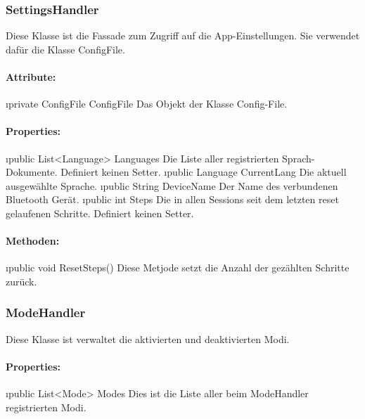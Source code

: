 \documentclass[../entwurf.tex]{subfiles}
\begin{document}
			\subsubsection{SettingsHandler}
				Diese Klasse ist die Fassade zum Zugriff auf die App-Einstellungen. Sie verwendet dafür die Klasse ConfigFile.
				\paragraph{Attribute:}
					\begin{itemize}
						\i{private ConfigFile ConfigFile} Das Objekt der Klasse Config-File.
					\end{itemize}
				\paragraph{Properties:}
					\begin{itemize}
						\i{public List<Language> Languages} Die Liste aller registrierten Sprach-Dokumente. Definiert keinen Setter.
						\i{public Language CurrentLang} Die aktuell ausgewählte Sprache.
						\i{public String DeviceName} Der Name des verbundenen Bluetooth Gerät.
						\i{public int Steps} Die in allen Sessions seit dem letzten reset gelaufenen Schritte. Definiert keinen Setter.
					\end{itemize}
				\paragraph{Methoden:}
					\begin{itemize}
						\i{public void ResetSteps()} Diese Metjode setzt die Anzahl der gezählten Schritte zurück.
					\end{itemize}
			\subsubsection{ModeHandler}
				Diese Klasse ist verwaltet die aktivierten und deaktivierten Modi.
				\paragraph{Properties:}
					\begin{itemize}
						\i{public List<Mode> Modes} Dies ist die Liste aller beim ModeHandler registrierten Modi.
					\end{itemize}
\end{document}

